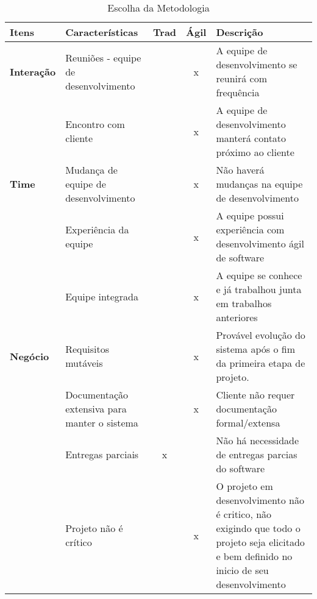 	\begin{table}[hbpt]
	\huge
	\vspace{1cm}
	\caption{Escolha da Metodologia}
		\begin{adjustbox}{width=1.0\textwidth}
			\begin{tabular}{|l|p{10cm}|c|c|p{15cm}|}
				\hline
				\textbf{Itens} & \textbf{Características} & \textbf{Trad} & \textbf{Ágil} & \textbf{Descrição} \\ \hline
				\multicolumn{ 1}{|l|}{\textbf{Interação}} & Reuniões - equipe de desenvolvimento &  & x & A equipe de desenvolvimento se reunirá com frequência \\ \cline{ 2- 5}
				\multicolumn{ 1}{|l|}{} & Encontro com cliente &  & x & A equipe de desenvolvimento manterá contato próximo ao cliente \\ \hline
				\multicolumn{ 1}{|l|}{\textbf{Time}} & Mudança de equipe de desenvolvimento &  & x & Não haverá mudanças na equipe de desenvolvimento \\ \cline{ 2- 5}
				\multicolumn{ 1}{|l|}{} & Experiência da equipe &  & x & A equipe possui experiência com desenvolvimento ágil de software \\ \cline{ 2- 5}
				\multicolumn{ 1}{|l|}{} & Equipe integrada &  & x & A equipe se conhece e já trabalhou junta em trabalhos anteriores \\ \hline
				\multicolumn{ 1}{|l|}{\textbf{Negócio}} & Requisitos mutáveis &  & x & Provável evolução do sistema após o fim da primeira etapa de projeto. \\ \cline{ 2- 5}
				\multicolumn{ 1}{|l|}{} & Documentação extensiva para manter o sistema &  & x & Cliente não requer documentação formal/extensa \\ \cline{ 2- 5}
				\multicolumn{ 1}{|l|}{} & Entregas parciais & x &  & Não há necessidade de entregas parcias do software  \\ \cline{ 2- 5}
				\multicolumn{ 1}{|l|}{} & Projeto não é crítico &  & x & O projeto em desenvolvimento não é critico, não exigindo que todo o projeto seja elicitado e bem definido no inicio de seu desenvolvimento \\ \hline
			\end{tabular}
		\end{adjustbox}
		\label{Escolha da Metodologia}
	\end{table}

	 


